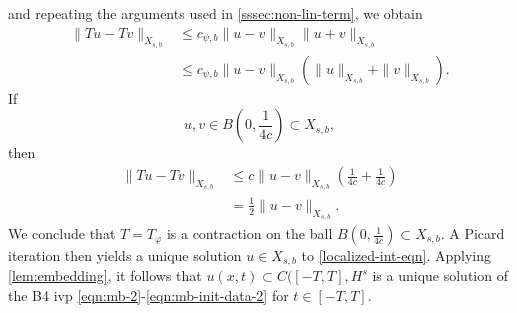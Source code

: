 \documentclass[12pt,reqno]{amsart}
\numberwithin{equation}{section}  %
\numberwithin{figure}{section}
\newcommand{\vp}{\varphi}
\theoremstyle{plain}
\theoremstyle{definition}
\theoremstyle{remark}
\begin{document}
%
and repeating the arguments used in \autoref{sssec:non-lin-term},
we obtain
%
\begin{equation}
	\label{20a}
	\begin{split}
		\|Tu - Tv \|_{X_{s,b}}  
		& \le c_{\psi, b} \|u -v\|_{X_{s,b}} \|u + v \|_{X_{s,b}}
		\\
		& \le c_{\psi, b} \|u -v\|_{X_{s,b}} (\|u\|_{X_{s,b}}+ \|v \|_{X_{s,b}}).
	\end{split}
\end{equation}
%
If $$ u, v \in B(0, \frac{1}{4c}) \subset X_{s,b},$$ then
%
\begin{equation}
	\label{21a}
	\begin{split}
		\|Tu - Tv \|_{X_{s,b}}
		& \le c \|u -v \|_{X_{s,b}} \left( \frac{1}{4c} + 
		\frac{1}{4c} \right)
		\\
		& = \frac{1}{2} \|u -v \|_{X_{s,b}}. 
	\end{split}
\end{equation}
%
We conclude that $T = T_{\vp}$ is a contraction on the ball $B(0, 
\frac{1}{4c}) \subset X_{s,b}$. A Picard iteration then yields a unique solution
$u \in X_{s,b}$ to \eqref{localized-int-eqn}. Applying
\autoref{lem:embedding}, it follows that $u(x,t) \subset C( [-T, T], H^s$ is a unique
solution of the B4 ivp \eqref{eqn:mb-2}-\eqref{eqn:mb-init-data-2} for $t
\in [-T, T]$.
%
%
\end{document}
